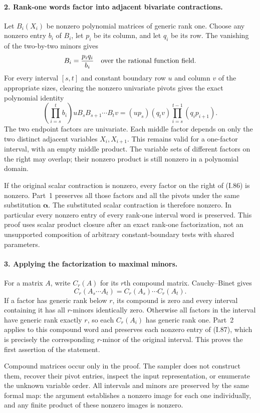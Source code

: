\paragraph{2. Rank-one words factor into adjacent bivariate contractions.}
Let $B_i(X_i)$ be nonzero polynomial matrices of generic rank one.
Choose any nonzero entry $b_i$ of $B_i$, let $p_i$ be its column,
and let $q_i$ be its row. The vanishing of the two-by-two minors gives
\[
 B_i=\frac{p_iq_i}{b_i}
 \quad\hbox{over the rational function field.}
\]
For every interval $[s,t]$ and constant boundary row $u$ and column
$v$ of the appropriate sizes, clearing the nonzero univariate
pivots gives the exact polynomial identity
\[
 \left(\prod_{i=s}^{t}b_i\right)
       uB_sB_{s+1}\cdots B_tv
 = (up_s)(q_tv)
       \prod_{i=s}^{t-1}(q_ip_{i+1}).
 \tag{I.86}
\]
The two endpoint factors are univariate. Each middle factor depends
on only the two distinct adjacent variables $X_i,X_{i+1}$.
This remains valid for a one-factor interval, with an empty middle
product. The variable sets of different factors on the right may
overlap; their nonzero product is still nonzero in a polynomial
domain.

If the original scalar contraction is nonzero, every factor on the
right of (I.86) is nonzero. Part~1 preserves all those factors and
all the pivots under the same substitution $\boldsymbol\alpha$.
The substituted scalar contraction is therefore nonzero. In
particular every nonzero entry of every rank-one interval word is
preserved. This proof uses scalar product closure after an exact
rank-one factorization, not an unsupported composition of arbitrary
constant-boundary tests with shared parameters.

\paragraph{3. Applying the factorization to maximal minors.}
For a matrix $A$, write $C_r(A)$ for its $r$th compound matrix.
Cauchy--Binet gives
\[
 C_r(A_s\cdots A_t)=C_r(A_s)\cdots C_r(A_t).
 \tag{I.87}
\]
If a factor has generic rank below $r$, its compound is zero and
every interval containing it has all $r$-minors identically zero.
Otherwise all factors in the interval have generic rank exactly
$r$, so each $C_r(A_i)$ has generic rank one. Part~2 applies to
this compound word and preserves each nonzero entry of (I.87),
which is precisely the corresponding $r$-minor of the original
interval. This proves the first assertion of the statement.

Compound matrices occur only in the proof. The sampler does not
construct them, recover their pivot entries, inspect the input
representation, or enumerate the unknown variable order. All
intervals and minors are preserved by the same formal map: the
argument establishes a nonzero image for each one individually,
and any finite product of these nonzero images is nonzero.

